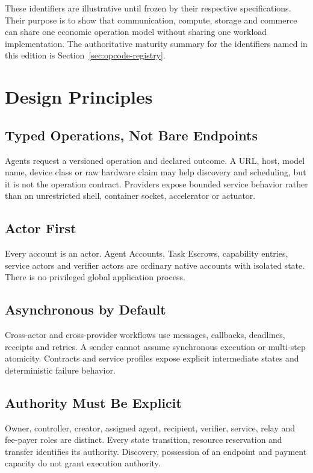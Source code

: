 \documentclass[11pt,oneside]{article}
\begin{document}
These identifiers are illustrative until frozen by their respective specifications. Their
purpose is to show that communication, compute, storage and commerce can share one economic
operation model without sharing one workload implementation. The authoritative maturity
summary for the identifiers named in this edition is Section~\ref{sec:opcode-registry}.

\section{Design Principles}

\subsection{Typed Operations, Not Bare Endpoints}

Agents request a versioned operation and declared outcome. A URL, host, model name, device
class or raw hardware claim may help discovery and scheduling, but it is not the operation
contract. Providers expose bounded service behavior rather than an unrestricted shell,
container socket, accelerator or actuator.

\subsection{Actor First}

Every account is an actor. Agent Accounts, Task Escrows, capability entries, service actors
and verifier actors are ordinary native accounts with isolated state. There is no privileged
global application process.

\subsection{Asynchronous by Default}

Cross-actor and cross-provider workflows use messages, callbacks, deadlines, receipts and
retries. A sender cannot assume synchronous execution or multi-step atomicity. Contracts and
service profiles expose explicit intermediate states and deterministic failure behavior.

\subsection{Authority Must Be Explicit}

Owner, controller, creator, assigned agent, recipient, verifier, service, relay and fee-payer
roles are distinct. Every state transition, resource reservation and transfer identifies its
authority. Discovery, possession of an endpoint and payment capacity do not grant execution
authority.
\end{document}
